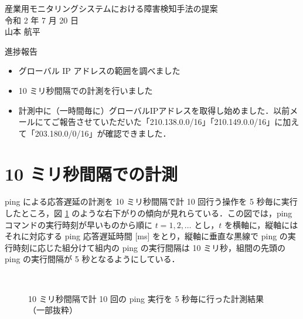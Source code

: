 \documentclass[a4j]{jarticle}
\begin{document}
\begin{table}[t]
\begin{center}
{\large 産業用モニタリングシステムにおける障害検知手法の提案}\\
令和 2 年 7 月 20 日\\
山本 航平
\end{center}
\end{table}

進捗報告
\begin{itemize}
\item グローバル IP アドレスの範囲を調べました
\item 10 ミリ秒間隔での計測を行いました
\item 計測中に（一時間毎に）グローバルIPアドレスを取得し始めました．以前メールにてご報告させていただいた「210.138.0.0/16」「210.149.0.0/16」に加えて「203.180.0/0/16」が確認できました．
\end{itemize}

\section{10 ミリ秒間隔での計測}
ping による応答遅延の計測を 10 ミリ秒間隔で計 10 回行う操作を 5 秒毎に実行したところ，図 \ref{short} のような右下がりの傾向が見れらている．この図では，ping コマンドの実行時刻が早いものから順に $t = 1,2,\ldots$ とし，$t$ を横軸に，縦軸にはそれに対応する ping 応答遅延時間 [ms] をとり，縦軸に垂直な黒線で ping の実行時刻に応じた組分けて組内の ping の実行間隔は 10 ミリ秒，組間の先頭の ping の実行間隔が 5 秒となるようにしている．
\begin{figure}[tb]
\begin{center}
~
~
\caption{10 ミリ秒間隔で計 10 回の ping 実行を 5 秒毎に行った計測結果（一部抜粋）}
\label{short}
\end{center}
\end{figure}
\end{document}
